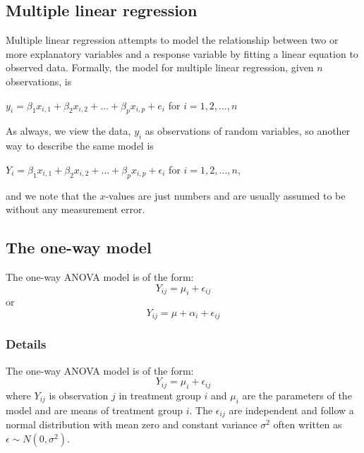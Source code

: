 \documentclass[12pt,a4paper]{article}
\theoremstyle{regla}
\theoremstyle{remark}
\theoremstyle{definition}
\theoremstyle{nonumberbreak}
\begin{document}
  

 

\subsection{Multiple linear regression}
\begin{fbox}
\begin{minipage}{0.97\textwidth}
Multiple linear regression attempts to model the relationship between two or more explanatory variables and a response variable by fitting a linear equation to observed data. Formally, the model for multiple linear regression, given $n$ observations, is

$y_i = \beta_1 x_{i,1} + \beta_2 x_{i,2} + \ldots + \beta_p x_{i,p} + e_i$ for $i = 1,2, \ldots , n$



As always, we view the data, $y_i$ as observations of random variables, so another way to describe the same model is

$Y_i = \beta_1 x_{i,1} + \beta_2 x_{i,2} + \ldots + \beta_p x_{i,p} + \epsilon_i$ for $i = 1,2, \ldots , n$,


and we note that the $x$-values are just numbers and are usually assumed to be without any measurement error.



\end{minipage}
\end{fbox}

\subsection{The one-way model}
\begin{fbox}
\begin{minipage}{0.97\textwidth}
The one-way ANOVA model is of the form:
$$Y_{ij}=\mu_i+\epsilon_{ij}$$
or 
$$Y_{ij}=\mu+\alpha_i+\epsilon_{ij}$$
\end{minipage}
\end{fbox}
\subsubsection{Details}
The one-way ANOVA model is of the form:
$$Y_{ij}=\mu_i+\epsilon_{ij}$$
where $Y_{ij}$ is observation $j$ in treatment group $i$ and $\mu_i$ are the parameters of the model and are means of treatment group $i$. The $\epsilon_{ij}$ are independent and follow a normal distribution with mean zero and constant variance $\sigma^2$ often written as $\epsilon\sim N(0,\sigma^2)$.\\
\end{document}
